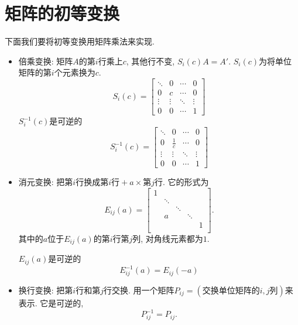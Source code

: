 \section{矩阵的初等变换}
下面我们要将初等变换用矩阵乘法来实现.

\begin{itemize}
    \item 倍乘变换: 矩阵$A$的第$i$行乘上$c$, 其他行不变, $S_i(c) A = A'$. $S_i(c)$为将单位矩阵的第$i$个元素换为$c$.
    \begin{equation}
      S_i (c) = \begin{bmatrix}
        \ddots&0&\cdots&0\\
        0&c&\cdots&0\\
        \vdots&\vdots&\ddots&\vdots\\
        0&0&\cdots&1
      \end{bmatrix}
    \end{equation}
    $S^{-1}_i (c)$是可逆的
    \begin{equation}
      S^{-1}_i (c) = \begin{bmatrix}
        \ddots&0&\cdots&0\\
        0&\frac{1}{c}&\cdots&0\\
        \vdots&\vdots&\ddots&\vdots\\
        0&0&\cdots&1
      \end{bmatrix}
    \end{equation}

    \item 消元变换: 
    把第$i$行换成$\text{第$i$行} + a \times \text{第$j$行}$. 它的形式为
    \begin{equation}
      E_{ij}(a) = \begin{bmatrix}
       1 &  &  &  & \\
        & \ddots &  &  & \\
        &  & \ddots &  & \\
        & a &  & \ddots & \\
        &  &  &  & 1\\
      \end{bmatrix}.
    \end{equation}
    其中的$a$位于$E_{ij}(a)$的第$i$行第$j$列, 对角线元素都为$1$.
    
    $E_{ij}(a)$是可逆的
    \begin{equation}
      E_{ij}^{-1}(a) = E_{ij}(-a)
    \end{equation}

    \item 换行变换:
    把第$i$行和第$j$行交换. 用一个矩阵$P_{ij} = (\text{交换单位矩阵的$i,j$列})$来表示.
    它是可逆的,
    \begin{equation}
      P^{-1}_{ij}= P_{ij}.
    \end{equation}
\end{itemize}


